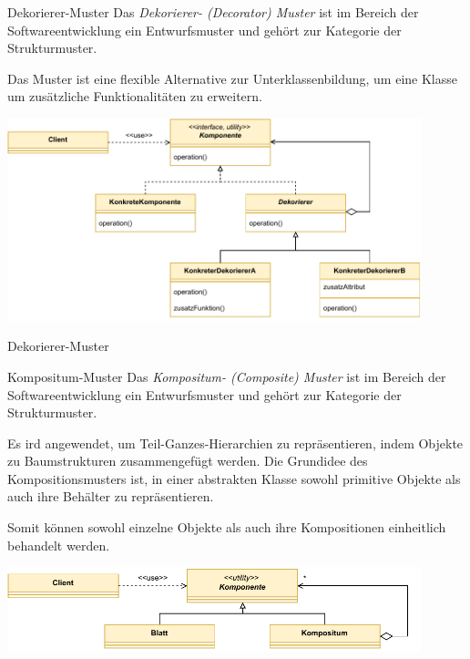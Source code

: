 \begin{defi}{Dekorierer-Muster}
    Das \emph{Dekorierer- (Decorator) Muster} ist im Bereich der Softwareentwicklung ein Entwurfsmuster und gehört zur Kategorie der Strukturmuster.

    Das Muster ist eine flexible Alternative zur Unterklassenbildung, um eine Klasse um zusätzliche Funktionalitäten zu erweitern.

    \begin{center}
        \includegraphics[width=0.9\textwidth]{includes/figures/defi_dekorierer.pdf}
    \end{center}
\end{defi}

\begin{example}{Dekorierer-Muster}

    

    
\end{example}

\begin{defi}{Kompositum-Muster}
    Das \emph{Kompositum- (Composite) Muster} ist im Bereich der Softwareentwicklung ein Entwurfsmuster und gehört zur Kategorie der Strukturmuster.

    Es ird angewendet, um Teil-Ganzes-Hierarchien zu repräsentieren, indem Objekte zu Baumstrukturen zusammengefügt werden.
    Die Grundidee des Kompositionsmusters ist, in einer abstrakten Klasse sowohl primitive Objekte als auch ihre Behälter zu repräsentieren.

    Somit können sowohl einzelne Objekte als auch ihre Kompositionen einheitlich behandelt werden.

    \begin{center}
        \includegraphics[width=0.9\textwidth]{includes/figures/defi_kompositum.pdf}
    \end{center}
\end{defi}

